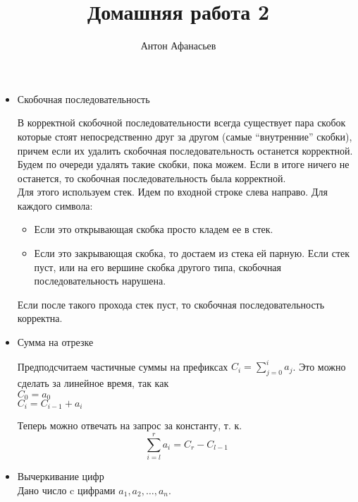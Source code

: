 \documentclass[10pt]{article}
\begin{document}
\title{Домашняя работа 2}
\author{Антон Афанасьев}
\maketitle

\begin{itemize}

\item Скобочная последовательность 

В корректной скобочной последовательности всегда существует пара скобок которые стоят непосредственно друг за другом (самые ``внутренние'' скобки), причем если их удалить скобочная последовательность останется корректной. Будем по очереди удалять такие скобки, пока можем. Если в итоге ничего не останется, то скобочная последовательность была корректной.\\
Для этого используем стек. Идем по входной строке слева направо. Для каждого символа:
\begin{itemize}
\item Если это открывающая скобка просто кладем ее в стек.
\item Если это закрывающая скобка, то достаем из стека ей парную. Если стек пуст, или на его вершине скобка другого типа, скобочная последовательность нарушена.
\end{itemize}
Если после такого прохода стек пуст, то скобочная последовательность корректна.

\item Сумма на отрезке

Предподсчитаем частичные суммы на префиксах $C_i = \sum_{j=0}^i a_j$. Это можно сделать за линейное время, так как \\
$C_0=a_0$\\
$C_i = C_{i-1} + a_i$

Теперь можно отвечать на запрос за константу, т. к.
$$\sum_{i=l}^r a_i = C_r - C_{l-1}$$

\item Вычеркивание цифр\\
Дано число c цифрами $a_1, a_2, \ldots, a_n$.


\end{itemize}
\end{document}
